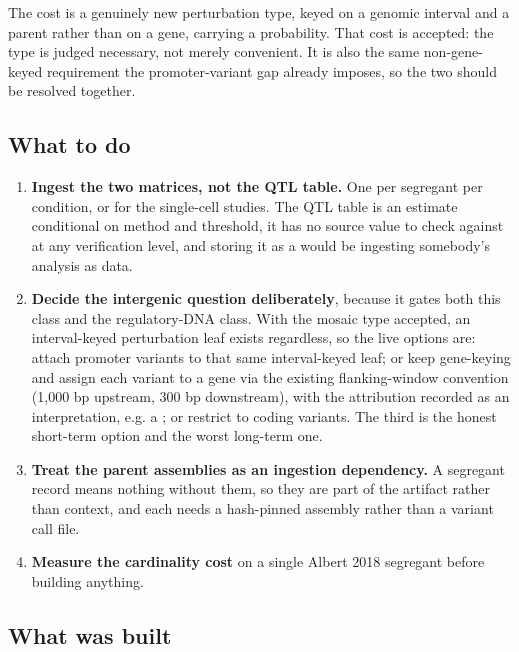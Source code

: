 The cost is a genuinely new perturbation type, keyed on a genomic interval and a parent
rather than on a gene, carrying a probability. That cost is accepted: the type is judged
necessary, not merely convenient. It is also the same non-gene-keyed requirement the
promoter-variant gap already imposes, so the two should be resolved together.

\subsection{What to do}\label{sec:todo}

\begin{enumerate}[leftmargin=1.4em,itemsep=2pt,topsep=2pt]
  \item \textbf{Ingest the two matrices, not the QTL table.} One
     per segregant per condition, or
     for the single-cell studies. The QTL table is an
    estimate conditional on method and threshold, it has no source value to check against
    at any verification level, and storing it as a  would be ingesting
    somebody's analysis as data.
  \item \textbf{Decide the intergenic question deliberately}, because it gates both this
    class and the regulatory-DNA class. With the mosaic type accepted, an interval-keyed
    perturbation leaf exists regardless, so the live options are: attach promoter
    variants to that same interval-keyed leaf; or keep gene-keying and assign each
    variant to a gene via the existing flanking-window convention (1,000 bp upstream,
    300 bp downstream), with the attribution recorded as an interpretation, e.g. a
    ; or restrict to coding variants. The third is the honest
    short-term option and the worst long-term one.
  \item \textbf{Treat the parent assemblies as an ingestion dependency.} A segregant record
    means nothing without them, so they are part of the artifact rather than context, and
    each needs a hash-pinned assembly rather than a variant call file.
  \item \textbf{Measure the cardinality cost} on a single Albert 2018 segregant before
    building anything.
\end{enumerate}

\subsection{What was built}\label{sec:built}

